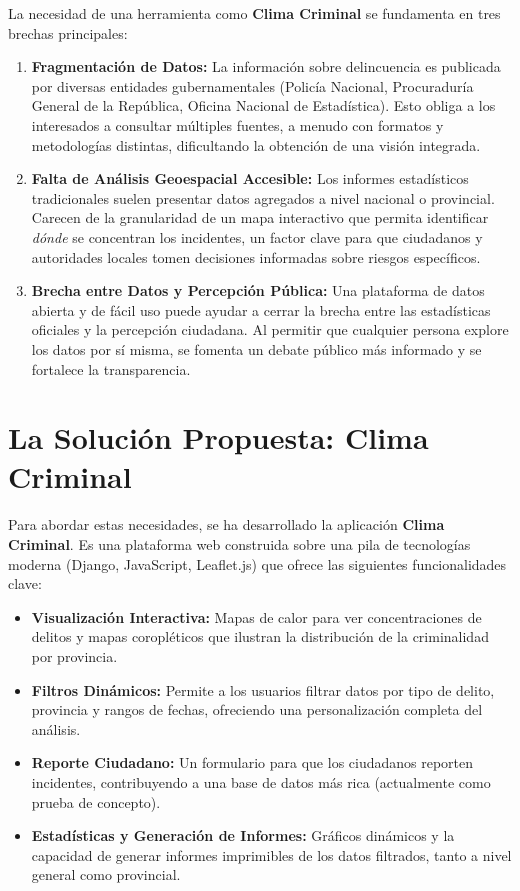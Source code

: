 \documentclass[12pt, a4paper]{article}
\begin{document}
La necesidad de una herramienta como \textbf{Clima Criminal} se fundamenta en tres brechas principales:

\begin{enumerate}
    \item \textbf{Fragmentación de Datos:} La información sobre delincuencia es publicada por diversas entidades gubernamentales (Policía Nacional, Procuraduría General de la República, Oficina Nacional de Estadística). Esto obliga a los interesados a consultar múltiples fuentes, a menudo con formatos y metodologías distintas, dificultando la obtención de una visión integrada.
    \item \textbf{Falta de Análisis Geoespacial Accesible:} Los informes estadísticos tradicionales suelen presentar datos agregados a nivel nacional o provincial. Carecen de la granularidad de un mapa interactivo que permita identificar \textit{dónde} se concentran los incidentes, un factor clave para que ciudadanos y autoridades locales tomen decisiones informadas sobre riesgos específicos.
    \item \textbf{Brecha entre Datos y Percepción Pública:} Una plataforma de datos abierta y de fácil uso puede ayudar a cerrar la brecha entre las estadísticas oficiales y la percepción ciudadana. Al permitir que cualquier persona explore los datos por sí misma, se fomenta un debate público más informado y se fortalece la transparencia.
\end{enumerate}

\section{La Solución Propuesta: Clima Criminal}

Para abordar estas necesidades, se ha desarrollado la aplicación \textbf{Clima Criminal}. Es una plataforma web construida sobre una pila de tecnologías moderna (Django, JavaScript, Leaflet.js) que ofrece las siguientes funcionalidades clave:

\begin{itemize}
    \item \textbf{Visualización Interactiva:} Mapas de calor para ver concentraciones de delitos y mapas coropléticos que ilustran la distribución de la criminalidad por provincia.
    \item \textbf{Filtros Dinámicos:} Permite a los usuarios filtrar datos por tipo de delito, provincia y rangos de fechas, ofreciendo una personalización completa del análisis.
    \item \textbf{Reporte Ciudadano:} Un formulario para que los ciudadanos reporten incidentes, contribuyendo a una base de datos más rica (actualmente como prueba de concepto).
    \item \textbf{Estadísticas y Generación de Informes:} Gráficos dinámicos y la capacidad de generar informes imprimibles de los datos filtrados, tanto a nivel general como provincial.
\end{itemize}
\end{document}
